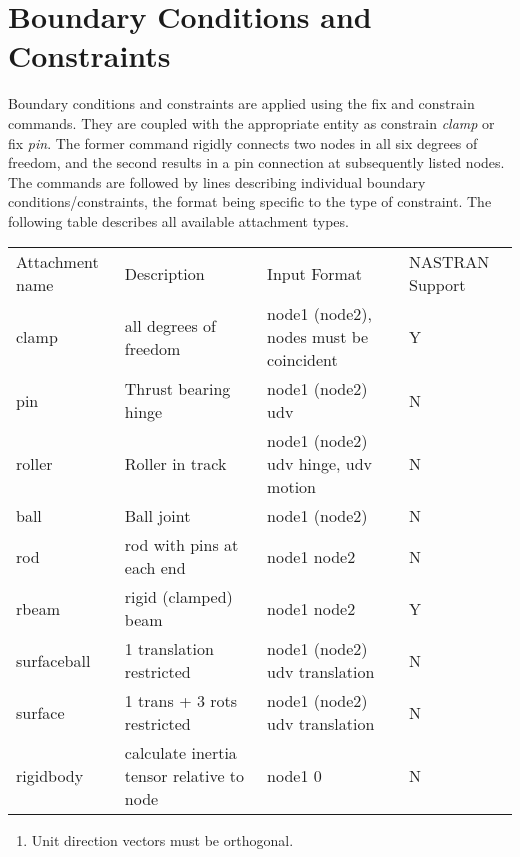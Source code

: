 \documentclass[12pt]{article}
\newcommand*{\sarg}[1]{\textit{#1}}
\newcommand*{\command}[1]{\textsf{#1}}
\begin{document}
\section{Boundary Conditions and Constraints}\label{sec:bcnconstr}
Boundary conditions and constraints are applied using the
\command{fix} and \command{constrain} commands. They are coupled with
the appropriate entity as \command{constrain} \sarg{clamp} or
\command{fix} \sarg{pin}. The former command rigidly connects two
nodes in all six degrees of freedom, and the second results in a pin
connection at subsequently listed nodes. The commands are followed by
lines describing individual boundary conditions/constraints, the
format being specific to the type of constraint. The following table
describes all available attachment types.



\begin{center}
{\small \begin{tabular}{|p{}|p{1.5in}|p{1.5in}|p{.75in}|}
  \hline
  Attachment name&Description &Input Format&NASTRAN Support\\
  \hhline{|====|} clamp & all degrees of freedom & node1 (node2), nodes must be coincident&Y\\ 
  \hline pin & Thrust bearing hinge & node1 (node2) udv &N\\ 
  \hline roller & Roller in track& node1 (node2) udv hinge, udv motion&N\\ 
  \hline ball & Ball joint & node1 (node2)&N\\ 
  \hline rod & rod with pins at each end& node1 node2&N\\ 
  \hline rbeam &rigid (clamped) beam & node1 node2&Y\\ 
  \hline surfaceball & 1 translation restricted & node1 (node2) udv translation&N\\ 
  \hline surface & 1 trans + 3 rots restricted & node1 (node2) udv translation&N\\ 
  \hline rigidbody& calculate inertia tensor relative to node& node1 0&N\\
\hline
\end{tabular}
}%
\begin{enumerate}
\item {Unit direction vectors must be orthogonal.}
\end{enumerate}


\end{center}
\end{document}
